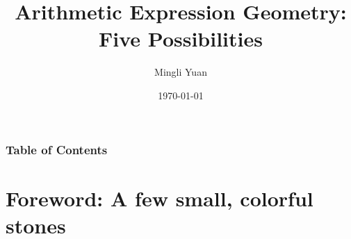 \documentclass[aspectratio=169]{beamer}
\title{Arithmetic Expression Geometry:\\Five Possibilities}
\author[Mingli Yuan]{Mingli Yuan}
\date{\today}
\begin{document}

\begin{frame}
    \maketitle
\end{frame}

\begin{frame}
    \frametitle{Table of Contents}
    \tableofcontents
\end{frame}

%

\section{Foreword: A few small, colorful stones}
\end{document}
